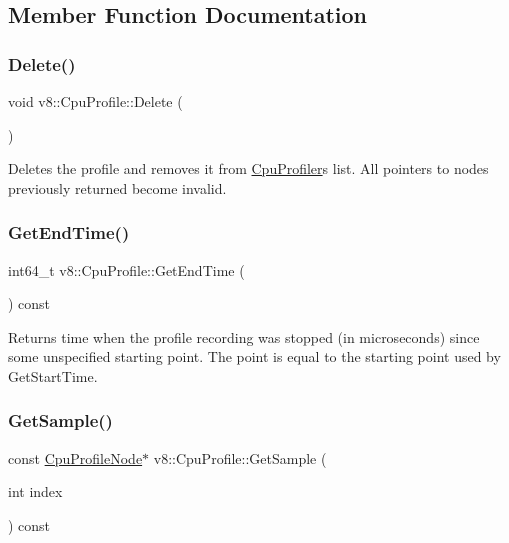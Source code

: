 \subsection{Member Function Documentation}
\mbox{\label{classv8_1_1CpuProfile_a70c93f0c14d07a7e1bad42ee95665ca0}} 
\subsubsection{\texorpdfstring{Delete()}{Delete()}}
{\footnotesize\ttfamily void v8\+::\+Cpu\+Profile\+::\+Delete (\begin{DoxyParamCaption}{ }\end{DoxyParamCaption})}

Deletes the profile and removes it from \mbox{\hyperlink{classv8_1_1CpuProfiler}{Cpu\+Profiler}}\textquotesingle{}s list. All pointers to nodes previously returned become invalid. \mbox{\label{classv8_1_1CpuProfile_a56f1dce6cc312c207d58131bde5c8fb8}} 
\subsubsection{\texorpdfstring{Get\+End\+Time()}{GetEndTime()}}
{\footnotesize\ttfamily int64\+\_\+t v8\+::\+Cpu\+Profile\+::\+Get\+End\+Time (\begin{DoxyParamCaption}{ }\end{DoxyParamCaption}) const}

Returns time when the profile recording was stopped (in microseconds) since some unspecified starting point. The point is equal to the starting point used by Get\+Start\+Time. \mbox{\label{classv8_1_1CpuProfile_adc6e2d7e63530752f3ab168586a19b65}} 
\subsubsection{\texorpdfstring{Get\+Sample()}{GetSample()}}
{\footnotesize\ttfamily const \mbox{\hyperlink{classv8_1_1CpuProfileNode}{Cpu\+Profile\+Node}}$\ast$ v8\+::\+Cpu\+Profile\+::\+Get\+Sample (\begin{DoxyParamCaption}\item[{int}]{index }\end{DoxyParamCaption}) const}

